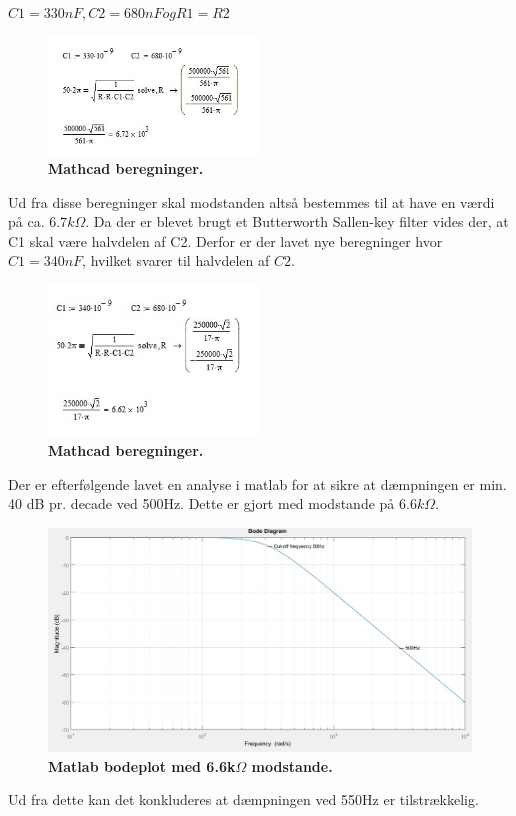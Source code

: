 $C1 = 330nF, C2=680nF og R1=R2$
\begin{figure}[H]
\includegraphics[width =0.5\textwidth , center]{billeder/mathcad}
\caption{\textbf{Mathcad beregninger.}}
\end{figure}
Ud fra disse beregninger skal modstanden altså bestemmes til at have en værdi på ca. $6.7k\Omega$. Da der er blevet brugt et Butterworth Sallen-key filter vides der, at C1 skal være halvdelen af C2. Derfor er der lavet nye beregninger hvor $C1=340nF$, hvilket svarer til halvdelen af $C2$.
\begin{figure}[H]
\includegraphics[width =0.5\textwidth , center]{billeder/mathcad2}
\caption{\textbf{Mathcad beregninger.}}
\end{figure}
Der er efterfølgende lavet en analyse i matlab for at sikre at dæmpningen er min. 40 dB pr. decade ved 500Hz. Dette er gjort med modstande på $6.6k\Omega$.
\begin{figure}[H]
\includegraphics[width =1.0\textwidth , center]{billeder/bodeplot}
\caption{\textbf{Matlab bodeplot med 6.6k$\Omega$ modstande.}}
\end{figure}
Ud fra dette kan det konkluderes at dæmpningen ved 550Hz er tilstrækkelig.
